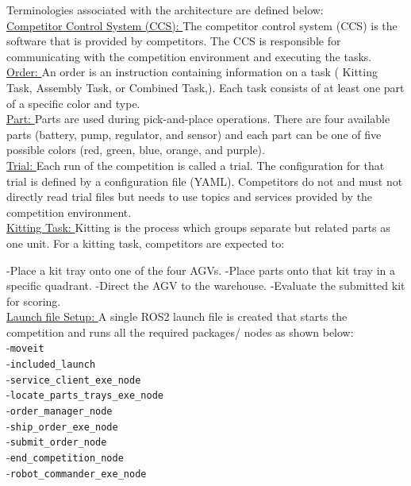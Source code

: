 \documentclass{uva-inf-article}
\begin{document}
\noindent Terminologies associated with the architecture are defined below:\\

\noindent \underline{Competitor Control System (CCS): }
The competitor control system (CCS) is the software that is provided by competitors. The CCS is responsible for communicating with the competition environment and executing the tasks.\\

\noindent \underline{Order: }
An order is an instruction containing information on a task ( Kitting Task, Assembly Task, or Combined Task,). Each task consists of at least one part of a specific color and type.\\

\noindent \underline{Part: }
Parts are used during pick-and-place operations. There are four available parts (battery, pump, regulator, and sensor) and each part can be one of five possible colors (red, green, blue, orange, and purple).\\

\noindent \underline{Trial: }
Each run of the competition is called a trial. The configuration for that trial is defined by a configuration file (YAML). Competitors do not and must not directly read trial files but needs to use topics and services provided by the competition environment.\\

\noindent \underline{Kitting Task: }
Kitting is the process which groups separate but related parts as one unit. For a kitting task, competitors are expected to:

-Place a kit tray onto one of the four AGVs.
-Place parts onto that kit tray in a specific quadrant.
-Direct the AGV to the warehouse.
-Evaluate the submitted kit for scoring.\\

\noindent \underline{Launch file Setup: }
A single ROS2 launch file is created that starts the competition and runs all the required packages/ nodes as shown below:\\
    -\verb|moveit|\\
    -\verb|included_launch|\\
    -\verb|service_client_exe_node|\\
    -\verb|locate_parts_trays_exe_node|\\
    -\verb|order_manager_node|\\
    -\verb|ship_order_exe_node|\\
    -\verb|submit_order_node|\\
    -\verb|end_competition_node|\\
    -\verb|robot_commander_exe_node|\\
\end{document}
